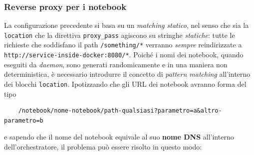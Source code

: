 \subsubsection{Reverse proxy per i notebook} \label{reverse-proxy-oauth}
La configurazione precedente si basa su un \textit{matching statico}, nel senso che sia la \verb|location| che la direttiva \verb|proxy_pass| agiscono su stringhe \textit{statiche}: tutte le richieste che soddisfano il path \verb|/something/*| verranno \textit{sempre} reindirizzate a \newline\verb|http://service-inside-docker:8080/*|.\newline
Poiché i nomi dei notebook, quando eseguiti da \textit{daemon}, sono generati randomicamente e in una maniera non deterministica, è necessario introdurre il concetto di \textit{pattern matching} all'interno dei blocchi \verb|location|.\newline
Ipotizzando che gli URL dei notebook avranno forma del tipo
\begin{verbatim}
    /notebook/nome-notebook/path-qualsiasi?parametro=a&altro-parametro=b
\end{verbatim}
e sapendo che il nome del notebook equivale al suo \textbf{nome DNS} all'interno dell'orchestratore, il problema può essere risolto in questo modo:

